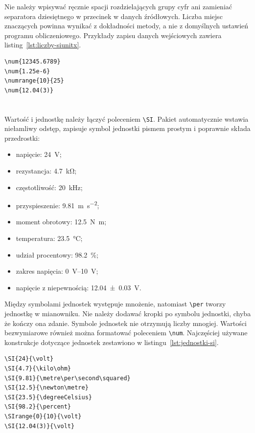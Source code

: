 Nie należy wpisywać ręcznie spacji rozdzielających grupy cyfr ani zamieniać separatora
dziesiętnego w przecinek w danych źródłowych. Liczba miejsc znaczących powinna wynikać
z dokładności metody, a nie z domyślnych ustawień programu obliczeniowego. Przykłady
zapisu danych wejściowych zawiera listing~\ref{lst:liczby-siunitx}.

\begin{lstlisting}[style=thesis,caption={Formatowanie liczb za pomocą siunitx},label={lst:liczby-siunitx}]
\num{12345.6789}
\num{1.25e-6}
\numrange{10}{25}
\num{12.04(3)}
\end{lstlisting}

\section{}

Wartość i jednostkę należy łączyć poleceniem \verb|\SI|. Pakiet automatycznie wstawia
niełamliwy odstęp, zapisuje symbol jednostki pismem prostym i poprawnie składa przedrostki:
\begin{itemize}
  \item napięcie: \SI{24}{\volt};
  \item rezystancja: \SI{4.7}{\kilo\ohm};
  \item częstotliwość: \SI{20}{\kilo\hertz};
  \item przyspieszenie: \SI{9.81}{\metre\per\second\squared};
  \item moment obrotowy: \SI{12.5}{\newton\metre};
  \item temperatura: \SI{23.5}{\degreeCelsius};
  \item udział procentowy: \SI{98.2}{\percent};
  \item zakres napięcia: \SIrange{0}{10}{\volt};
  \item napięcie z niepewnością: \SI{12.04(3)}{\volt}.
\end{itemize}

Między symbolami jednostek występuje mnożenie, natomiast \verb|\per| tworzy jednostkę
w mianowniku. Nie należy dodawać kropki po symbolu jednostki, chyba że kończy ona zdanie.
Symbole jednostek nie otrzymują liczby mnogiej. Wartości bezwymiarowe również można
formatować poleceniem \verb|\num|. Najczęściej używane konstrukcje dotyczące jednostek
zestawiono w listingu~\ref{lst:jednostki-si}.

\begin{lstlisting}[style=thesis,caption={Przykłady zapisu jednostek SI},label={lst:jednostki-si}]
\SI{24}{\volt}
\SI{4.7}{\kilo\ohm}
\SI{9.81}{\metre\per\second\squared}
\SI{12.5}{\newton\metre}
\SI{23.5}{\degreeCelsius}
\SI{98.2}{\percent}
\SIrange{0}{10}{\volt}
\SI{12.04(3)}{\volt}
\end{lstlisting}

